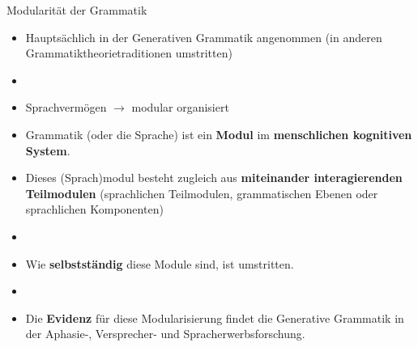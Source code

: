 \begin{frame}{Modularität der Grammatik}
	
\begin{itemize}
	\item Hauptsächlich in der Generativen Grammatik angenommen (in anderen Grammatiktheorietraditionen umstritten)
	\item[]
	\item Sprachvermögen $\rightarrow$ modular organisiert
	\item<2-> Grammatik (oder die Sprache) ist ein \textbf{Modul} im \textbf{menschlichen kognitiven System}.
	\item<2-> Dieses (Sprach)modul besteht zugleich aus \textbf{miteinander interagierenden Teilmodulen} (sprachlichen Teilmodulen, grammatischen Ebenen oder sprachlichen Komponenten)
	\item[]
	\item<3-> Wie \textbf{selbstständig} diese Module sind, ist umstritten.
	\item[]
	\item<3-> Die \textbf{Evidenz} für diese Modularisierung findet die Generative Grammatik in der Aphasie-, Versprecher- und Spracherwerbsforschung.  
\end{itemize}

\end{frame}




